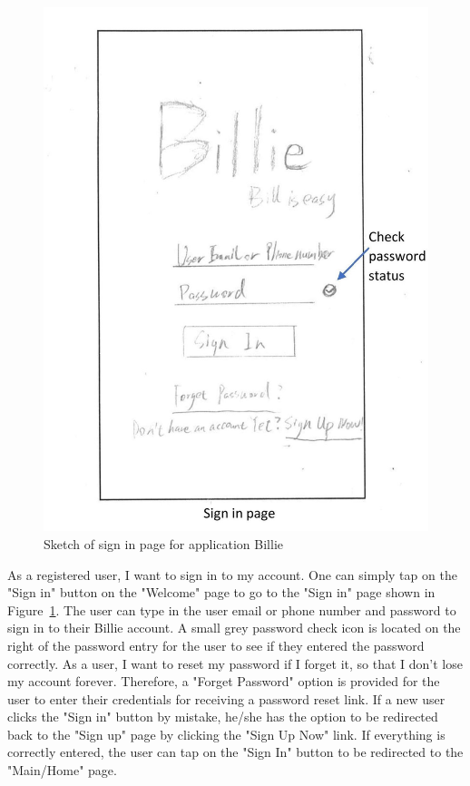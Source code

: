 \documentclass{sigchi}
\begin{document}
\begin{figure}[h!]
\centering
  \includegraphics[width=0.6\columnwidth]{3-sign-in-page.jpg}
  \caption{Sketch of sign in page for application Billie}
  \label{fig:figure18}
\end{figure}
As a registered user, I want to sign in to my account. One can simply tap on the "Sign in" button on the "Welcome" page to go to the "Sign in" page shown in Figure~\ref{fig:figure18}. The user can type in the user email or phone number and password to sign in to their Billie account. A small grey password check icon is located on the right of the password entry for the user to see if they entered the password correctly. As a user, I want to reset my password if I forget it, so that I don't lose my account forever. Therefore, a "Forget Password" option is provided for the user to enter their credentials for receiving a password reset link. If a new user clicks the "Sign in" button by mistake, he/she has the option to be redirected back to the "Sign up" page by clicking the "Sign Up Now" link. If everything is correctly entered, the user can tap on the "Sign In" button to be redirected to the "Main/Home" page.
\end{document}
